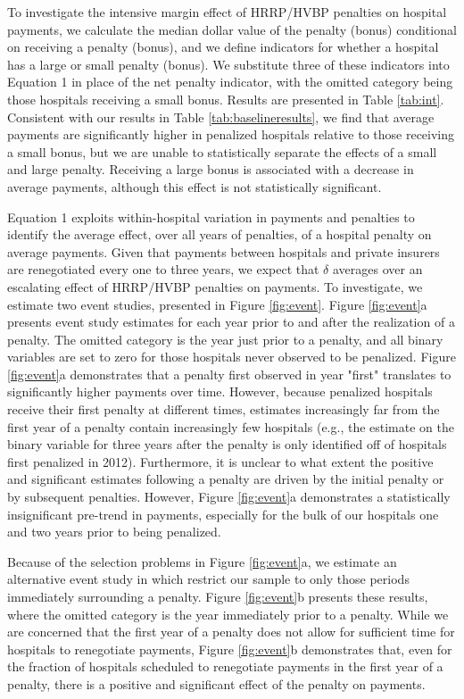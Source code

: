 \documentclass[12pt]{article}
\begin{document}
To investigate the intensive margin effect of HRRP/HVBP penalties on hospital payments, we calculate the median dollar value of the penalty (bonus) conditional on receiving a penalty (bonus), and we define indicators for whether a hospital has a large or small penalty (bonus).  We substitute three of these indicators into Equation 1 in place of the net penalty indicator, with the omitted category being those hospitals receiving a small bonus.  Results are presented in Table \ref{tab:int}.  Consistent with our results in Table \ref{tab:baselineresults}, we find that average payments are significantly higher in penalized hospitals relative to those receiving a small bonus, but we are unable to statistically separate the effects of a small and large penalty.  Receiving a large bonus is associated with a decrease in average payments, although this effect is not statistically significant.  


Equation 1 exploits within-hospital variation in payments and penalties to identify the average effect, over all years of penalties, of a hospital penalty on average payments.  Given that payments between hospitals and private insurers are renegotiated every one to three years, we expect that $\delta$ averages over an escalating effect of HRRP/HVBP penalties on payments.  To investigate, we estimate two event studies, presented in Figure \ref{fig:event}.  Figure \ref{fig:event}a presents event study estimates for each year prior to and after the realization of a penalty.  The omitted category is the year just prior to a penalty, and all binary variables are set to zero for those hospitals never observed to be penalized.  Figure \ref{fig:event}a demonstrates that a penalty first observed in year "first" translates to significantly higher payments over time.  However, because penalized hospitals receive their first penalty at different times, estimates increasingly far from the first year of a penalty contain increasingly few hospitals (e.g., the estimate on the binary variable for three years after the penalty is only identified off of hospitals first penalized in 2012).  Furthermore, it is unclear to what extent the positive and significant estimates following a penalty are driven by the initial penalty or by subsequent penalties.  However, Figure \ref{fig:event}a demonstrates a statistically insignificant pre-trend in payments, especially for the bulk of our hospitals one and two years prior to being penalized. 

Because of the selection problems in Figure \ref{fig:event}a, we estimate an alternative event study in which restrict our sample to only those periods immediately surrounding a penalty.  Figure \ref{fig:event}b presents these results, where the omitted category is the year immediately prior to a penalty.  While we are concerned that the first year of a penalty does not allow for sufficient time for hospitals to renegotiate payments, Figure \ref{fig:event}b demonstrates that, even for the fraction of hospitals scheduled to renegotiate payments in the first year of a penalty, there is a positive and significant effect of the penalty on payments.  
\end{document}
